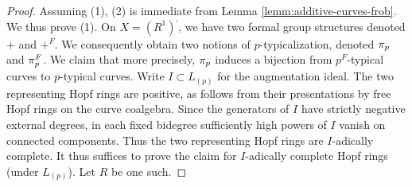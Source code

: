 \begin{proof}
Assuming (1), (2) is immediate from Lemma \ref{lemm:additive-curves-frob}.
We thus prove (1).
On $X=(R^1)^\comp$, we have two formal group structures denoted $+$ and $+^F$.
We consequently obtain two notions of $p$-typicalization, denoted $\mathrm \pi_p$ and $\mathrm \pi_p^F$.
We claim that more precisely, $\mathrm \pi_p$ induces a bijection from $p^F$-typical curves to $p$-typical curves.
Write $I \subset L_{(p)}$ for the augmentation ideal.
The two representing Hopf rings are positive, as follows from their presentations by free Hopf rings on the curve coalgebra. Since the generators of $I$ have strictly negative external degrees, in each fixed bidegree sufficiently high powers of $I$ vanish on connected components. Thus the two representing Hopf rings are $I$-adically complete.
It thus suffices to prove the claim for $I$-adically complete Hopf rings (under $L_{(p)}$).
Let $R$ be one such.


\end{proof}
